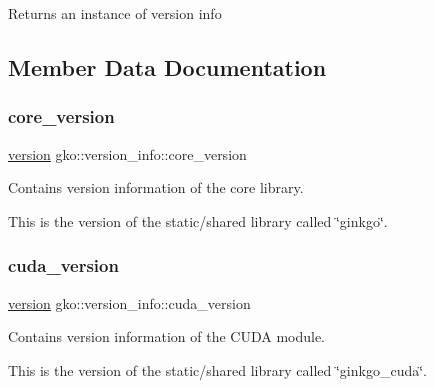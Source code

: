 \begin{DoxyReturn}{Returns}
an instance of version info 
\end{DoxyReturn}


\subsection{Member Data Documentation}
\mbox{\label{classgko_1_1version__info_a85dd2724c9c37cb7f315a99dc03f0d72}} 
\subsubsection{\texorpdfstring{core\+\_\+version}{core\_version}}
{\footnotesize\ttfamily \hyperlink{structgko_1_1version}{version} gko\+::version\+\_\+info\+::core\+\_\+version}



Contains version information of the core library. 

This is the version of the static/shared library called \char`\"{}ginkgo\char`\"{}. \mbox{\label{classgko_1_1version__info_a75d283ac87b2f80abdc48fa48b3a5d51}} 
\subsubsection{\texorpdfstring{cuda\+\_\+version}{cuda\_version}}
{\footnotesize\ttfamily \hyperlink{structgko_1_1version}{version} gko\+::version\+\_\+info\+::cuda\+\_\+version}



Contains version information of the C\+U\+DA module. 

This is the version of the static/shared library called \char`\"{}ginkgo\+\_\+cuda\char`\"{}. \mbox{\label{classgko_1_1version__info_a795e1a6f8bdb0a4157b2d52b92e7b44e}} 

